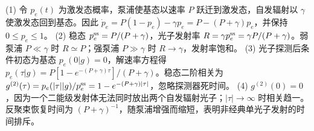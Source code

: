 (1) 令 \(p_e(t)\) 为激发态概率，泵浦使基态以速率 \(P\) 跃迁到激发态，自发辐射以 \(\gamma\) 使激发态回到基态。因此 \(\dot p_e=P(1-p_e)-\gamma p_e=P-(P+\gamma)p_e\)，并保持 \(0\le p_e\le1\)。
(2) 稳态 \(p_e^{\rm ss}=P/(P+\gamma)\)，光子发射率 \(R=\gamma p_e^{\rm ss}=\gamma P/(P+\gamma)\)。弱泵浦 \(P\ll\gamma\) 时 \(R\simeq P\)；强泵浦 \(P\gg\gamma\) 时 \(R\to\gamma\)，发射率饱和。
(3) 光子探测后条件初态为基态 \(p_e(0|g)=0\)，解速率方程得 \(p_e(\tau|g)=P[1-e^{-(P+\gamma)\tau}]/(P+\gamma)\)。稳态二阶相关为 \(g^{(2)}(\tau)=p_e(|\tau||g)/p_e^{\rm ss}=1-e^{-(P+\gamma)|\tau|}\)，忽略探测器死时间。
(4) \(g^{(2)}(0)=0\)，因为一个二能级发射体无法同时放出两个自发辐射光子；\(|\tau|\to\infty\) 时相关趋一。反聚束恢复时间为 \((P+\gamma)^{-1}\)，随泵浦增强而缩短，表明非经典单光子发射的时间排斥。
